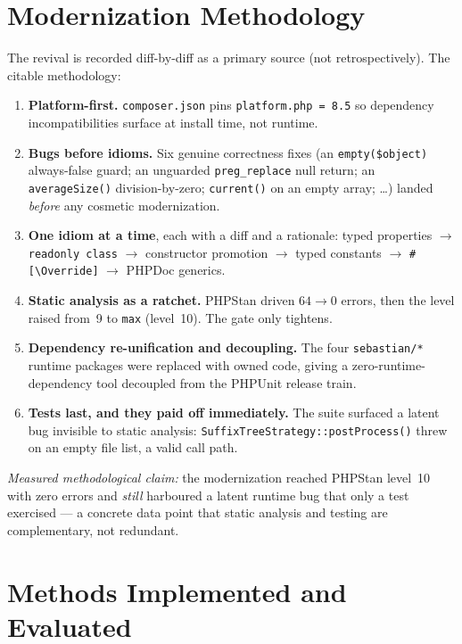 \documentclass[10pt,a4paper]{article}
\newcounter{prop}[section]
\newcounter{lem}[section]
\begin{document}
\section{Modernization Methodology}
\label{sec:method}

The revival is recorded diff-by-diff as a primary source (not retrospectively). The citable
methodology:
\begin{enumerate}[leftmargin=1.4em,itemsep=1pt,topsep=2pt]
  \item \textbf{Platform-first.} \texttt{composer.json} pins \texttt{platform.php = 8.5} so
        dependency incompatibilities surface at install time, not runtime.
  \item \textbf{Bugs before idioms.} Six genuine correctness fixes (an \lstinline!empty($object)!
        always-false guard; an unguarded \lstinline!preg_replace! null return; an
        \lstinline!averageSize()! division-by-zero; \lstinline!current()! on an empty array; \dots)
        landed \emph{before} any cosmetic modernization.
  \item \textbf{One idiom at a time}, each with a diff and a rationale: typed properties
        $\rightarrow$ \texttt{readonly class} $\rightarrow$ constructor promotion $\rightarrow$ typed
        constants $\rightarrow$ \texttt{\#[\textbackslash Override]} $\rightarrow$ PHPDoc generics.
  \item \textbf{Static analysis as a ratchet.} PHPStan driven $64\rightarrow0$ errors, then the
        level raised from~9 to \texttt{max} (level~10). The gate only tightens.
  \item \textbf{Dependency re-unification and decoupling.} The four \texttt{sebastian/*} runtime
        packages were replaced with owned code, giving a zero-runtime-dependency tool decoupled from
        the PHPUnit release train.
  \item \textbf{Tests last, and they paid off immediately.} The suite surfaced a latent bug invisible
        to static analysis: \lstinline!SuffixTreeStrategy::postProcess()! threw on an empty file
        list, a valid call path.
\end{enumerate}

\noindent\emph{Measured methodological claim:} the modernization reached PHPStan level~10 with zero
errors and \emph{still} harboured a latent runtime bug that only a test exercised --- a concrete data
point that static analysis and testing are complementary, not redundant.

\section{Methods Implemented and Evaluated}
\label{sec:engineering}
\end{document}
